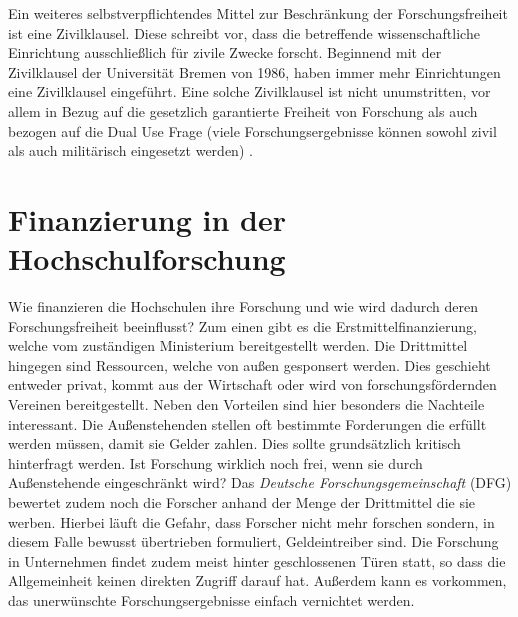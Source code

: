 \documentclass{pmwk}
\begin{document}
Ein weiteres selbstverpflichtendes Mittel zur Beschränkung der Forschungsfreiheit ist eine Zivilklausel. Diese schreibt vor, dass die betreffende wissenschaftliche Einrichtung ausschließlich für zivile Zwecke forscht. Beginnend mit der Zivilklausel der Universität Bremen von 1986, haben immer mehr Einrichtungen eine Zivilklausel eingeführt. Eine solche Zivilklausel ist nicht unumstritten, vor allem in Bezug auf die gesetzlich garantierte Freiheit von Forschung als auch bezogen auf die Dual Use Frage (viele Forschungsergebnisse können sowohl zivil als auch militärisch eingesetzt werden) \cite{JKrause}. 

\section*{Finanzierung in der Hochschulforschung}
Wie finanzieren die Hochschulen ihre Forschung und wie wird dadurch deren Forschungsfreiheit beeinflusst? Zum einen gibt es die Erstmittelfinanzierung, welche vom zuständigen Ministerium bereitgestellt werden. Die Drittmittel hingegen sind Ressourcen, welche von außen gesponsert werden. Dies geschieht entweder privat, kommt aus der Wirtschaft oder wird von forschungsfördernden Vereinen bereitgestellt. Neben den Vorteilen sind hier besonders die Nachteile interessant. Die Außenstehenden stellen oft bestimmte Forderungen die erfüllt werden müssen, damit sie Gelder zahlen. Dies sollte grundsätzlich kritisch hinterfragt werden. Ist Forschung wirklich noch frei, wenn sie durch Außenstehende eingeschränkt wird? Das \textit{Deutsche Forschungsgemeinschaft} (DFG) bewertet zudem noch die Forscher anhand der Menge der Drittmittel die sie werben. Hierbei läuft die Gefahr, dass Forscher nicht mehr forschen sondern, in diesem Falle bewusst übertrieben formuliert, Geldeintreiber sind.  Die Forschung in Unternehmen findet zudem meist hinter geschlossenen Türen statt, so dass die Allgemeinheit keinen direkten Zugriff darauf hat. Außerdem kann es vorkommen, das unerwünschte Forschungsergebnisse einfach vernichtet werden.
\end{document}
